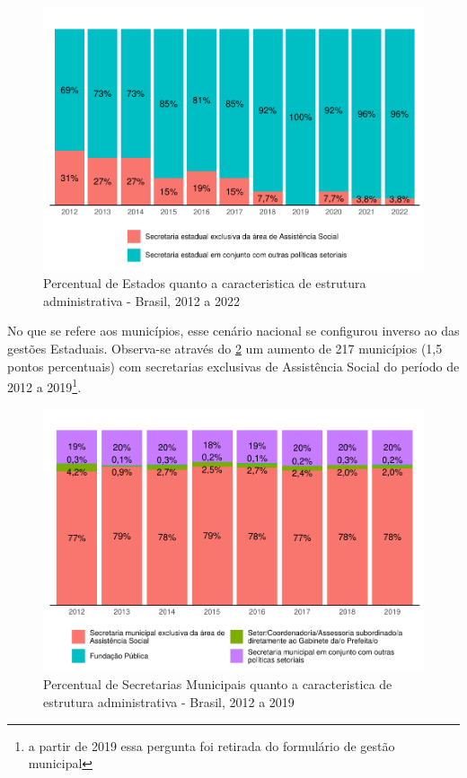 \documentclass[
  brazilian]{report}
\begin{document}
\begin{figure}
\includegraphics{Censo-SUAS-2022_files/figure-latex/estados_sec_exc-1} \caption[Percentual de Estados quanto a caracteristica de estrutura administrativa - Brasil, 2012 a 2022]{Percentual de Estados quanto a caracteristica de estrutura administrativa - Brasil, 2012 a 2022}\label{fig:estados_sec_exc}
\end{figure}

No que se refere aos municípios, esse cenário nacional se configurou
inverso ao das gestões Estaduais. Observa-se através do
\cref{fig:sec-munic-exc} um aumento de 217 municípios (1,5 pontos
percentuais) com secretarias exclusivas de Assistência Social do período
de 2012 a
2019\footnote{a partir de 2019 essa pergunta foi retirada do formulário de gestão municipal}.

\begin{figure}
\includegraphics{Censo-SUAS-2022_files/figure-latex/sec-munic-exc-1} \caption[Percentual de Secretarias Municipais quanto a caracteristica de estrutura administrativa - Brasil, 2012 a 2019]{Percentual de Secretarias Municipais quanto a caracteristica de estrutura administrativa - Brasil, 2012 a 2019}\label{fig:sec-munic-exc}
\end{figure}
\end{document}
